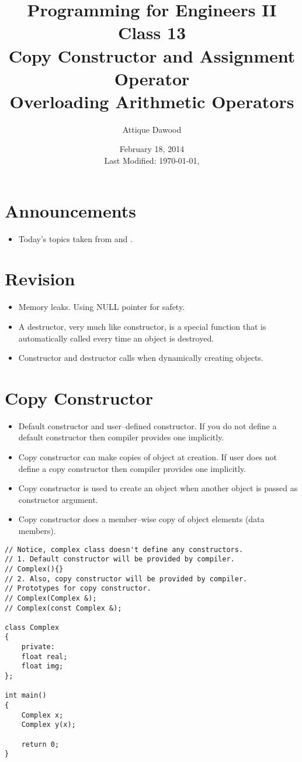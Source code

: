 \documentclass[12pt,a4paper]{article}
\title{\vspace{-2cm}Programming for Engineers II\\Class 13\\Copy Constructor and Assignment Operator\\Overloading Arithmetic Operators}
\author{Attique Dawood}
\date{February 18, 2014\\[0.2cm] Last Modified: \today, \currenttime}
\begin{document}
\maketitle
\section{Announcements}
\begin{itemize}
\item Today's topics taken from \cite{Ref:CPP-Copy-Constructor-and-Assignment-Operator} and \cite{Ref:CPP-Operator-Overloading}.
\end{itemize}
\section{Revision}
\begin{itemize}
\item Memory leaks. Using NULL pointer for safety.
\item A destructor, very much like constructor, is a special function that is automatically called every time an object is destroyed.
\item Constructor and destructor calls when dynamically creating objects.
\end{itemize}
\section{Copy Constructor}
\begin{itemize}
\item Default constructor and user--defined constructor. If you do not define a default constructor then compiler provides one implicitly.
\item Copy constructor can make copies of object at creation. If user does not define a copy constructor then compiler provides one implicitly.
\item Copy constructor is used to create an object when another object is passed as constructor argument.
\item Copy constructor does a member--wise copy of object elements (data members).
\end{itemize}
\begin{lstlisting}[caption={Copy Constructor}]
// Notice, complex class doesn't define any constructors.
// 1. Default constructor will be provided by compiler.
// Complex(){}
// 2. Also, copy constructor will be provided by compiler.
// Prototypes for copy constructor.
// Complex(Complex &);
// Complex(const Complex &);

class Complex
{
	private:
	float real;
	float img;
};

int main()
{
	Complex x;
	Complex y(x);
	
	return 0;
}
\end{lstlisting}
\end{document}
